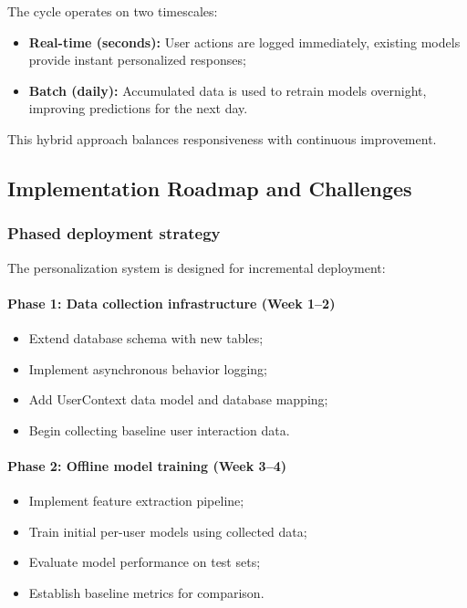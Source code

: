 The cycle operates on two timescales:
\begin{itemize}
    \item \textbf{Real-time (seconds):} User actions are logged immediately,
    existing models provide instant personalized responses;
    \item \textbf{Batch (daily):} Accumulated data is used to retrain models
    overnight, improving predictions for the next day.
\end{itemize}

This hybrid approach balances responsiveness with continuous improvement.

\subsection{Implementation Roadmap and Challenges}
\label{sec:implementation-roadmap}

\subsubsection{Phased deployment strategy}

The personalization system is designed for incremental deployment:

\paragraph{Phase 1: Data collection infrastructure (Week 1--2)}
\begin{itemize}
    \item Extend database schema with new tables;
    \item Implement asynchronous behavior logging;
    \item Add UserContext data model and database mapping;
    \item Begin collecting baseline user interaction data.
\end{itemize}

\paragraph{Phase 2: Offline model training (Week 3--4)}
\begin{itemize}
    \item Implement feature extraction pipeline;
    \item Train initial per-user models using collected data;
    \item Evaluate model performance on test sets;
    \item Establish baseline metrics for comparison.
\end{itemize}

